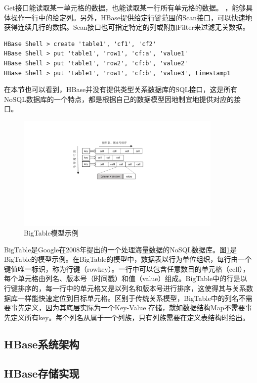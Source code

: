 Get接口能读取某一单元格的数据，也能读取某一行所有单元格的数据。
，能够具体操作一行中的给定列。另外，HBase提供给定行键范围的Scan接口，可以快速地获得连续几行的数据。Scan接口也可指定特定的列或附加Filter来过滤无关数据。

\begin{verbatim}
HBase Shell > create 'table1', 'cf1', 'cf2'
HBase Shell > put 'table1', 'row1', 'cf:a', 'value1'
HBase Shell > put 'table1', 'row2', 'cf:b', 'value2'
HBase Shell > put 'table1', 'row1', 'cf:b', 'value3', timestamp1

\end{verbatim}

在本节也可以看到，HBase并没有提供类型关系数据库的SQL接口，这是所有NoSQL数据库的一个特点，都是根据自己的数据模型因地制宜地提供对应的接口。


\begin{figure}[htbp]
\centering
\includegraphics[width=100mm]{fig/big_table.pdf}
\caption{BigTable模型示例}
\label{fig:big_table}
\end{figure}

BigTable是Google在2008年提出的一个处理海量数据的NoSQL数据库。图\ref{fig:big_table}是BigTable的模型示例。在BigTable的模型中，数据表以行为单位组织，每行由一个键值唯一标识，称为行键（rowkey）。一行中可以包含任意数目的单元格（cell），每个单元格由列名、版本号（时间戳）和值（value）组成。BigTable中的行是以行键排序的，每一行中的单元格又是以列名和版本号进行排序，这使得其与关系数据库一样能快速定位到目标单元格。区别于传统关系模型，BigTable中的列名不需要事先定义，因为其底层实际为一个Key-Value 存储，就如数据结构Map不需要事先定义所有key。每个列名从属于一个列族，只有列族需要在定义表结构时给出。


\subsection{HBase系统架构}
\subsection{HBase存储实现}


